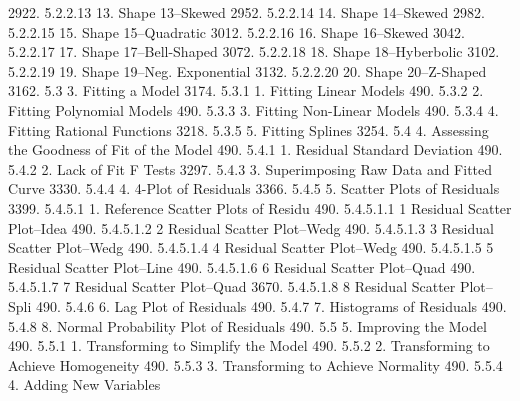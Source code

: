 2922.     5.2.2.13                         13. Shape 13--Skewed
2952.     5.2.2.14                         14. Shape 14--Skewed
2982.     5.2.2.15                         15. Shape 15--Quadratic
3012.     5.2.2.16                         16. Shape 16--Skewed
3042.     5.2.2.17                         17. Shape 17--Bell-Shaped
3072.     5.2.2.18                         18. Shape 18--Hyberbolic
3102.     5.2.2.19                         19. Shape 19--Neg. Exponential
3132.     5.2.2.20                         20. Shape 20--Z-Shaped
3162.     5.3                   3. Fitting a Model
3174.     5.3.1                       1. Fitting Linear Models
490.      5.3.2                       2. Fitting Polynomial Models
490.      5.3.3                       3. Fitting Non-Linear Models
490.      5.3.4                       4. Fitting Rational Functions
3218.     5.3.5                       5. Fitting Splines
3254.     5.4                   4. Assessing the Goodness of Fit of the Model
490.      5.4.1                       1. Residual Standard Deviation
490.      5.4.2                       2. Lack of Fit F Tests
3297.     5.4.3                       3. Superimposing Raw Data and Fitted Curve
3330.     5.4.4                       4. 4-Plot of Residuals
3366.     5.4.5                       5. Scatter Plots of Residuals
3399.     5.4.5.1                           1. Reference Scatter Plots of Residu
490.      5.4.5.1.1                               1  Residual Scatter Plot--Idea
490.      5.4.5.1.2                               2  Residual Scatter Plot--Wedg
490.      5.4.5.1.3                               3  Residual Scatter Plot--Wedg
490.      5.4.5.1.4                               4  Residual Scatter Plot--Wedg
490.      5.4.5.1.5                               5  Residual Scatter Plot--Line
490.      5.4.5.1.6                               6  Residual Scatter Plot--Quad
490.      5.4.5.1.7                               7  Residual Scatter Plot--Quad
3670.     5.4.5.1.8                               8  Residual Scatter Plot--Spli
490.      5.4.6                       6. Lag Plot of Residuals
490.      5.4.7                       7. Histograms of Residuals
490.      5.4.8                       8. Normal Probability Plot of Residuals
490.      5.5                   5. Improving the Model
490.      5.5.1                       1. Transforming to Simplify the Model
490.      5.5.2                       2. Transforming to Achieve Homogeneity
490.      5.5.3                       3. Transforming to Achieve Normality
490.      5.5.4                       4. Adding New Variables
